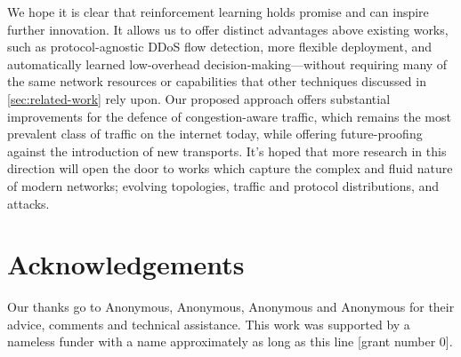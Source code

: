 \documentclass[10pt, times, conference, letterpaper]{IEEEtran}
\begin{document}
We hope it is clear that reinforcement learning holds promise and can inspire further innovation.
It allows us to offer distinct advantages above existing works, such as protocol-agnostic DDoS flow detection, more flexible deployment, and automatically learned low-overhead decision-making---without requiring many of the same network resources or capabilities that other techniques discussed in \cref{sec:related-work} rely upon.
Our proposed approach offers substantial improvements for the defence of congestion-aware traffic, which remains the most prevalent class of traffic on the internet today, while offering future-proofing against the introduction of new transports.
It's hoped that more research in this direction will open the door to works which capture the complex and fluid nature of modern networks; evolving topologies, traffic and protocol distributions, and attacks.

\section*{Acknowledgements}
Our thanks go to Anonymous, Anonymous, Anonymous and Anonymous for their advice, comments and technical assistance.
This work was supported by a nameless funder with a name approximately as long as this line [grant number 0].

\renewcommand*{\bibfont}{\footnotesize}
\printbibliography
\end{document}
